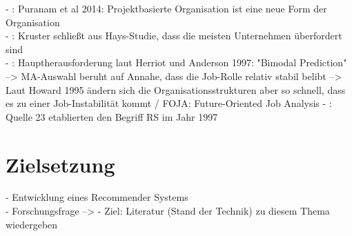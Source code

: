 - \cite{towardsADesign:2017}: Puranam et al 2014: Projektbasierte Organisation ist eine neue Form der Organisation\\
- \cite{personalbeschaffung:2017}: Kruster schließt aus Hays-Studie, dass die meisten Unternehmen überfordert sind \\
- \cite{futurePerspectivesOnEmployeeSelection:2004}: Hauptherausforderung laut Herriot und Anderson 1997: "Bimodal Prediction" --> MA-Auswahl beruht auf Annahe, dass die Job-Rolle relativ stabil belibt --> Laut Howard 1995 ändern sich die Organisationsstrukturen aber so schnell, dass es zu einer Job-Instabilität kommt / FOJA: Future-Oriented Job Analysis
- \cite{malinowski:2006}: Quelle 23 etablierten den Begriff RS im Jahr 1997 \\

\section{Zielsetzung}
\label{sec:intro:zielsetzung}
- Entwicklung eines Recommender Systems \\
- Forschungsfrage --> - Ziel: Literatur (Stand der Technik) zu diesem Thema wiedergeben


